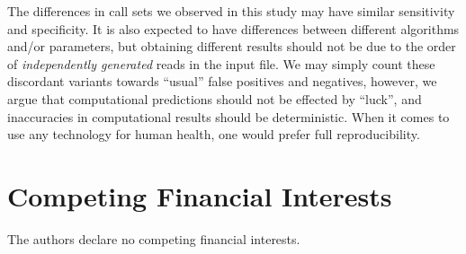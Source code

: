 \documentclass[10pt,a4paper]{article}
\newcommand {\junk}[1]{}
\begin{document}
The differences in call sets we observed in this study 
may have similar sensitivity and specificity.
It is also expected to
have differences between different algorithms and/or parameters, but
obtaining different results should not be due to the order of {\it independently generated} reads in the input file. 
We may simply count these discordant variants towards ``usual'' false positives and negatives, however, 
we argue that computational predictions should not be effected by ``luck'', and inaccuracies in computational results should be deterministic.
When it comes to use any technology for human health, one would prefer full reproducibility. 


\junk{
\section*{Acknowledgments}
We thank H.I. Özercan, A. Gündoğdu, A.K. Şenol, and M.Y. Özkaya for the initial observation of the effects of reshuffling reads in alignment results using BWA-MEM. We also thank M. Somel, 
O. Gokcumen, E. Cicek, and O. Tastan for
their valuable comments during the preparation of this manuscript. 

Funding for this project was provided by a Marie Curie Career Integration Grant (303772) and an 
EMBO Installation Grant (IG-2521) to C.A.


\section*{Author Contributions}
C.A. conceived the project. C.F. and C.A. analyzed the data and wrote the manuscript.

}

\section*{Competing Financial Interests}
The authors declare no competing financial interests.

\small




\clearpage


\end{document}
